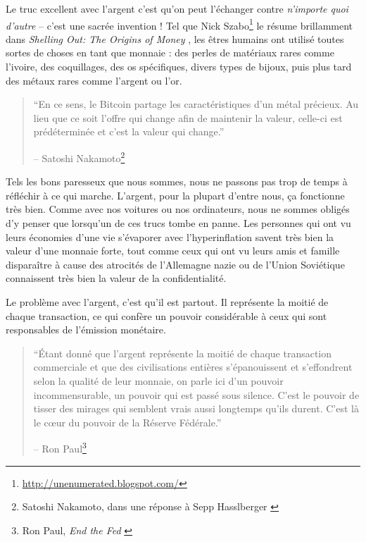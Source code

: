 Le truc excellent avec l'argent c'est qu'on peut l'échanger contre
\textit{n'importe quoi d'autre} -- c'est une sacrée invention ! Tel que Nick
Szabo\footnote{\url{http://unenumerated.blogspot.com/}} le résume
brillamment dans \textit{Shelling Out: The Origins of Money}
\cite{shelling-out}, les êtres humains ont utilisé toutes sortes de choses en
tant que monnaie : des perles de matériaux rares comme l'ivoire, des
coquillages, des os spécifiques, divers types de bijoux, puis plus tard des
métaux rares comme l'argent ou l'or.

\begin{quotation}\begin{samepage}
\enquote{En ce sens, le Bitcoin partage les caractéristiques d'un métal précieux. Au lieu que
ce soit l'offre qui change afin de maintenir la valeur, celle-ci est
prédéterminée et c'est la valeur qui change.}
\begin{flushright} -- Satoshi Nakamoto\footnote{Satoshi Nakamoto, dans une
réponse à Sepp Hasslberger \cite{satoshi-precious-metal}}
\end{flushright}\end{samepage}\end{quotation}

Tels les bons paresseux que nous sommes, nous ne passons pas trop de temps à
réfléchir à ce qui marche. L'argent, pour la plupart d'entre nous, ça fonctionne
très bien. Comme avec nos voitures ou nos ordinateurs, nous ne sommes obligés
d'y penser que lorsqu'un de ces trucs tombe en panne. Les personnes qui ont vu
leurs économies d'une vie s'évaporer avec l'hyperinflation savent très bien la
valeur d'une monnaie forte, tout comme ceux qui ont vu leurs amis et famille
disparaître à cause des atrocités de l'Allemagne nazie ou de l'Union Soviétique
connaissent très bien la valeur de la confidentialité.

Le problème avec l'argent, c'est qu'il est partout. Il représente la moitié de
chaque transaction, ce qui confère un pouvoir considérable à ceux qui sont
responsables de l'émission monétaire.

\begin{quotation}\begin{samepage}
\enquote{Étant donné que l'argent représente la moitié de chaque transaction
commerciale et que des civilisations entières s'épanouissent et s'effondrent
selon la qualité de leur monnaie, on parle ici d'un pouvoir incommensurable, un
pouvoir qui est passé sous silence. C'est le pouvoir de tisser des mirages qui
semblent vrais aussi longtemps qu'ils durent. C'est là le cœur du pouvoir de la
Réserve Fédérale.}
\begin{flushright} -- Ron Paul\footnote{Ron Paul, \textit{End the Fed}
\cite{end-the-fed}}
\end{flushright}\end{samepage}\end{quotation}


